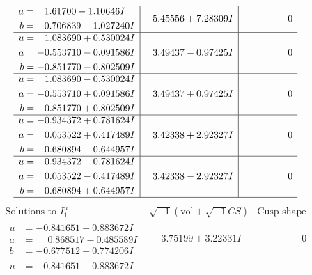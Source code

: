 \documentclass[1p]{elsarticle_modified}
\theoremstyle{definition}
\newcommand{\I}{\sqrt{-1}}
\begin{document}
$$\begin{array}{c|c|c}
\begin{aligned}
a &= \phantom{-}1.61700 - 1.10646 I \\
b &= -0.706839 - 1.027240 I\end{aligned}
 & -5.45556 + 7.28309 I & \phantom{-0.000000 } 0 \\ \hline\begin{aligned}
u &= \phantom{-}1.083690 + 0.530024 I \\
a &= -0.553710 - 0.091586 I \\
b &= -0.851770 - 0.802509 I\end{aligned}
 & \phantom{-}3.49437 - 0.97425 I & \phantom{-0.000000 } 0 \\ \hline\begin{aligned}
u &= \phantom{-}1.083690 - 0.530024 I \\
a &= -0.553710 + 0.091586 I \\
b &= -0.851770 + 0.802509 I\end{aligned}
 & \phantom{-}3.49437 + 0.97425 I & \phantom{-0.000000 } 0 \\ \hline\begin{aligned}
u &= -0.934372 + 0.781624 I \\
a &= \phantom{-}0.053522 + 0.417489 I \\
b &= \phantom{-}0.680894 - 0.644957 I\end{aligned}
 & \phantom{-}3.42338 + 2.92327 I & \phantom{-0.000000 } 0 \\ \hline\begin{aligned}
u &= -0.934372 - 0.781624 I \\
a &= \phantom{-}0.053522 - 0.417489 I \\
b &= \phantom{-}0.680894 + 0.644957 I\end{aligned}
 & \phantom{-}3.42338 - 2.92327 I & \phantom{-0.000000 } 0\\
 \hline 
 \end{array}$$\newpage$$\begin{array}{c|c|c}  
\text{Solutions to }I^u_{1}& \I (\text{vol} + \sqrt{-1}CS) & \text{Cusp shape}\\
 \hline 
\begin{aligned}
u &= -0.841651 + 0.883672 I \\
a &= \phantom{-}0.868517 - 0.485589 I \\
b &= -0.677512 - 0.774206 I\end{aligned}
 & \phantom{-}3.75199 + 3.22331 I & \phantom{-0.000000 } 0 \\ \hline\begin{aligned}
u &= -0.841651 - 0.883672 I \\

\end{aligned}
\end{array}$$
\end{document}
